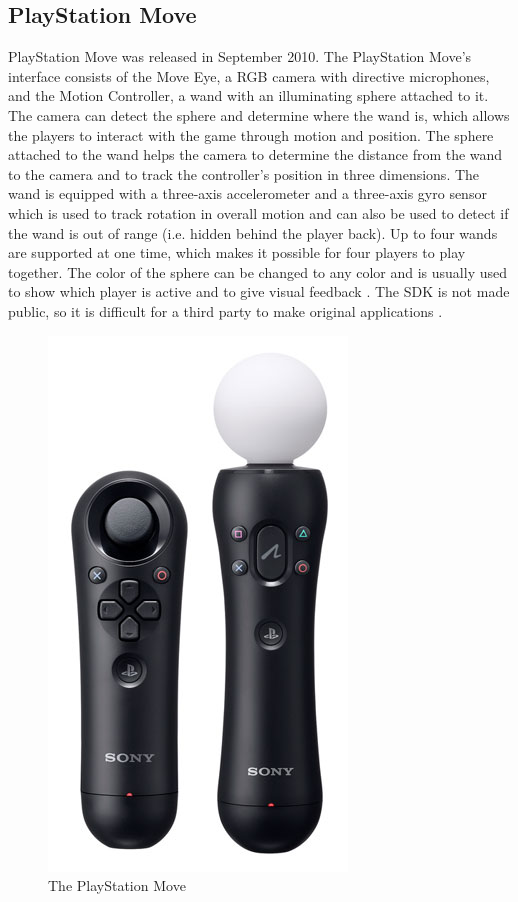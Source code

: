 \subsection{PlayStation Move}
PlayStation Move was released in September 2010. The PlayStation Move’s interface consists of the Move Eye, a RGB camera with directive microphones, and the Motion Controller, a wand with an illuminating sphere attached to it. The camera can detect the sphere and determine where the wand is, which allows the players to interact with the game through motion and position. The sphere attached to the wand helps the camera to determine the distance from the wand to the camera and to track the controller's position in three dimensions. The wand is equipped with a three-axis accelerometer and a three-axis gyro sensor which is used to track rotation in overall motion and can also be used to detect if the wand is out of range (i.e. hidden behind the player back). \cite{comparison} Up to four wands are supported at one time, which makes it possible for four players to play together. The color of the sphere can be changed to any color and is usually used to show which player is active and to give visual feedback \cite{ppmove}. The SDK is not made public, so it is difficult for a third party to make original applications \cite{comparison}. 
\begin{figure}[h!]
\begin{center}
\includegraphics[scale=0.3]{PSmove}
\caption[PlayStation Move]{The PlayStation Move}
\label{fig:PSMove}
\end{center}
\end{figure}

